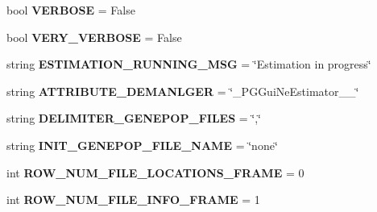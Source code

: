 \begin{DoxyCompactItemize}
\item 
bool {\bfseries V\+E\+R\+B\+O\+SE} = False\hypertarget{namespacenegui_1_1pgguineestimator_a1ffbed1aec8ac5063fab52cf0605f431}{}\label{namespacenegui_1_1pgguineestimator_a1ffbed1aec8ac5063fab52cf0605f431}

\item 
bool {\bfseries V\+E\+R\+Y\+\_\+\+V\+E\+R\+B\+O\+SE} = False\hypertarget{namespacenegui_1_1pgguineestimator_ae24535f1f88887fc88f20b704065e2a8}{}\label{namespacenegui_1_1pgguineestimator_ae24535f1f88887fc88f20b704065e2a8}

\item 
string {\bfseries E\+S\+T\+I\+M\+A\+T\+I\+O\+N\+\_\+\+R\+U\+N\+N\+I\+N\+G\+\_\+\+M\+SG} = \char`\"{}Estimation in progress\char`\"{}\hypertarget{namespacenegui_1_1pgguineestimator_a04419b16466c03c66ca3c22d0303c61b}{}\label{namespacenegui_1_1pgguineestimator_a04419b16466c03c66ca3c22d0303c61b}

\item 
string {\bfseries A\+T\+T\+R\+I\+B\+U\+T\+E\+\_\+\+D\+E\+M\+A\+N\+L\+G\+ER} = \char`\"{}\+\_\+\+P\+G\+Gui\+Ne\+Estimator\+\_\+\+\_\+\char`\"{}\hypertarget{namespacenegui_1_1pgguineestimator_a5aa381f1b0ea2af954957d4ff41544bb}{}\label{namespacenegui_1_1pgguineestimator_a5aa381f1b0ea2af954957d4ff41544bb}

\item 
string {\bfseries D\+E\+L\+I\+M\+I\+T\+E\+R\+\_\+\+G\+E\+N\+E\+P\+O\+P\+\_\+\+F\+I\+L\+ES} = \char`\"{},\char`\"{}\hypertarget{namespacenegui_1_1pgguineestimator_acf4e9b079a4b7f1335f88436d2a22f43}{}\label{namespacenegui_1_1pgguineestimator_acf4e9b079a4b7f1335f88436d2a22f43}

\item 
string {\bfseries I\+N\+I\+T\+\_\+\+G\+E\+N\+E\+P\+O\+P\+\_\+\+F\+I\+L\+E\+\_\+\+N\+A\+ME} = \char`\"{}none\char`\"{}\hypertarget{namespacenegui_1_1pgguineestimator_ae511b42960920308bfce6e5955e1c235}{}\label{namespacenegui_1_1pgguineestimator_ae511b42960920308bfce6e5955e1c235}

\item 
int {\bfseries R\+O\+W\+\_\+\+N\+U\+M\+\_\+\+F\+I\+L\+E\+\_\+\+L\+O\+C\+A\+T\+I\+O\+N\+S\+\_\+\+F\+R\+A\+ME} = 0\hypertarget{namespacenegui_1_1pgguineestimator_a8a76bdddf674051818ab8c86270e3d26}{}\label{namespacenegui_1_1pgguineestimator_a8a76bdddf674051818ab8c86270e3d26}

\item 
int {\bfseries R\+O\+W\+\_\+\+N\+U\+M\+\_\+\+F\+I\+L\+E\+\_\+\+I\+N\+F\+O\+\_\+\+F\+R\+A\+ME} = 1\hypertarget{namespacenegui_1_1pgguineestimator_a996229947c1d06efdcee8bfa03c537fb}{}\label{namespacenegui_1_1pgguineestimator_a996229947c1d06efdcee8bfa03c537fb}


\end{DoxyCompactItemize}
